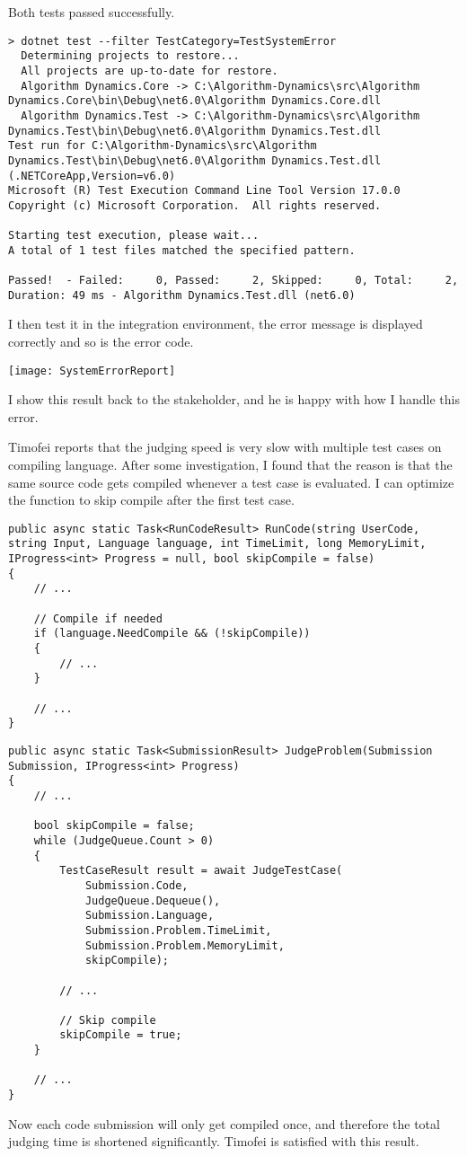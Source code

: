 \documentclass[report.tex]{subfiles}
\begin{document}
Both tests passed successfully.

\begin{verbatim}
> dotnet test --filter TestCategory=TestSystemError
  Determining projects to restore...
  All projects are up-to-date for restore.
  Algorithm Dynamics.Core -> C:\Algorithm-Dynamics\src\Algorithm Dynamics.Core\bin\Debug\net6.0\Algorithm Dynamics.Core.dll
  Algorithm Dynamics.Test -> C:\Algorithm-Dynamics\src\Algorithm Dynamics.Test\bin\Debug\net6.0\Algorithm Dynamics.Test.dll
Test run for C:\Algorithm-Dynamics\src\Algorithm Dynamics.Test\bin\Debug\net6.0\Algorithm Dynamics.Test.dll (.NETCoreApp,Version=v6.0)
Microsoft (R) Test Execution Command Line Tool Version 17.0.0
Copyright (c) Microsoft Corporation.  All rights reserved.

Starting test execution, please wait...
A total of 1 test files matched the specified pattern.

Passed!  - Failed:     0, Passed:     2, Skipped:     0, Total:     2, Duration: 49 ms - Algorithm Dynamics.Test.dll (net6.0)
\end{verbatim}

I then test it in the integration environment, the error message is displayed correctly and so is the error code.

\texttt{[image: SystemErrorReport]}

I show this result back to the stakeholder, and he is happy with how I handle this error.

Timofei reports that the judging speed is very slow with multiple test cases on compiling language. After some investigation, I found that the reason is that the same source code gets compiled whenever a test case is evaluated. I can optimize the  function to skip compile after the first test case.

\begin{verbatim}
public async static Task<RunCodeResult> RunCode(string UserCode, string Input, Language language, int TimeLimit, long MemoryLimit, IProgress<int> Progress = null, bool skipCompile = false)
{
    // ...

    // Compile if needed
    if (language.NeedCompile && (!skipCompile))
    {
        // ...
    }

    // ...
}
\end{verbatim}


\begin{verbatim}
public async static Task<SubmissionResult> JudgeProblem(Submission Submission, IProgress<int> Progress)
{
    // ...

    bool skipCompile = false;
    while (JudgeQueue.Count > 0)
    {
        TestCaseResult result = await JudgeTestCase(
            Submission.Code,
            JudgeQueue.Dequeue(),
            Submission.Language,
            Submission.Problem.TimeLimit,
            Submission.Problem.MemoryLimit,
            skipCompile);

        // ...

        // Skip compile
        skipCompile = true;
    }

    // ...
}
\end{verbatim}

Now each code submission will only get compiled once, and therefore the total judging time is shortened significantly. Timofei is satisfied with this result.
\end{document}
